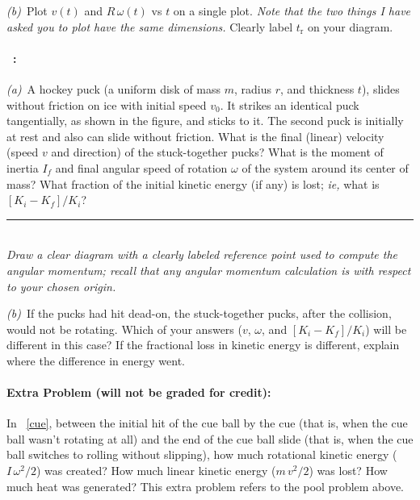 \documentclass[12pt]{article}
\begin{document}
\textsl{(b)}~Plot $v(t)$ and $R\,\omega(t)$ vs $t$ on a single plot.
\emph{Note that the two things I have asked you to plot have the same
dimensions.}  Clearly label $t_\mathrm{r}$ on your diagram.

\paragraph{\problemname~\theproblem:}%
\textsl{(a)}~A hockey puck (a uniform disk of mass $m$, radius $r$,
and thickness $t$), slides without friction on ice with initial speed
$v_0$.  It strikes an identical puck tangentially, as shown in the
figure, and sticks to it.  The second puck is initially at rest and
also can slide without friction.  What is the final (linear) velocity
(speed $v$ and direction) of the stuck-together pucks?  What is the
moment of inertia $I_f$ and final angular speed of rotation $\omega$
of the system around its center of mass?  What fraction of the initial
kinetic energy (if any) is lost; \textit{ie,} what is $[K_i-K_f]/K_i$?
\\ \rule{0.25\textwidth}{0pt}
\\

\emph{Draw a clear diagram with a clearly labeled reference point used
to compute the angular momentum; recall that any angular momentum
calculation is with respect to your chosen origin.}

\textsl{(b)}~If the pucks had hit dead-on, the stuck-together pucks,
after the collision, would not be rotating.  Which of your answers
($v$, $\omega$, and $[K_i-K_f]/K_i$) will be different in this case?
If the fractional loss in kinetic energy is different, explain where
the difference in energy went.

\paragraph{Extra Problem (will not be graded for credit):}%
In \problemname~\ref{cue}, between the initial hit of the cue ball by the cue (that is, when the
cue ball wasn't rotating at all) and the end of the cue ball
slide (that is, when the cue ball switches to rolling without
slipping), how much rotational kinetic energy ($I\,\omega^2 / 2$) was
created? How much linear kinetic energy ($m\,v^2 / 2$) was lost? How
much heat was generated? This extra problem refers to the pool problem
above.
\end{document}
